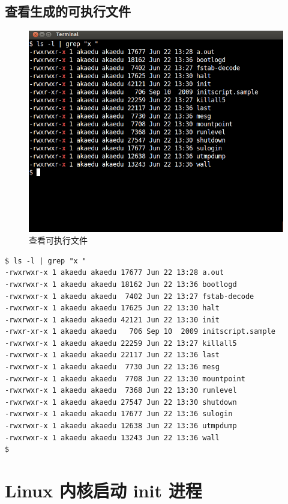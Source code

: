 \subsection{查看生成的可执行文件}

\begin{figure}[htbp]
\centering
\includegraphics{./pictures/1-5-executables.png}
\caption{查看可执行文件}
\end{figure}

{\begin{shaded}\begin{verbatim}
$ ls -l | grep "x "
-rwxrwxr-x 1 akaedu akaedu 17677 Jun 22 13:28 a.out
-rwxrwxr-x 1 akaedu akaedu 18162 Jun 22 13:36 bootlogd
-rwxrwxr-x 1 akaedu akaedu  7402 Jun 22 13:27 fstab-decode
-rwxrwxr-x 1 akaedu akaedu 17625 Jun 22 13:30 halt
-rwxrwxr-x 1 akaedu akaedu 42121 Jun 22 13:30 init
-rwxr-xr-x 1 akaedu akaedu   706 Sep 10  2009 initscript.sample
-rwxrwxr-x 1 akaedu akaedu 22259 Jun 22 13:27 killall5
-rwxrwxr-x 1 akaedu akaedu 22117 Jun 22 13:36 last
-rwxrwxr-x 1 akaedu akaedu  7730 Jun 22 13:36 mesg
-rwxrwxr-x 1 akaedu akaedu  7708 Jun 22 13:30 mountpoint
-rwxrwxr-x 1 akaedu akaedu  7368 Jun 22 13:30 runlevel
-rwxrwxr-x 1 akaedu akaedu 27547 Jun 22 13:30 shutdown
-rwxrwxr-x 1 akaedu akaedu 17677 Jun 22 13:36 sulogin
-rwxrwxr-x 1 akaedu akaedu 12638 Jun 22 13:36 utmpdump
-rwxrwxr-x 1 akaedu akaedu 13243 Jun 22 13:36 wall
$ 
\end{verbatim}\end{shaded}}
\section{Linux 内核启动 init 进程}

